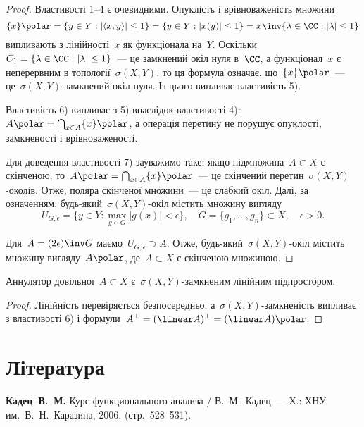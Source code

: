 \begin{proof}
    Властивості 1--4 є очевидними. Опуклість і
    врівноваженість множини
    \begin{equation*}
        \{x\}\polar = \{y \in Y: |\langle x, y \rangle| \le 1\} = \{y \in Y: |x(y)| \le 1 \} = x\inv \{\lambda \in \CC: |\lambda| \le 1\}
    \end{equation*}
    випливають з лінійності~$x$ як функціонала на~$Y$. Оскільки~$C_1 = \{ \lambda \in \CC: |\lambda| \le 1\}$~--- це замкнений окіл нуля в~$\CC$, а функціонал~$x$ є неперервним в топології~$\sigma(X, Y)$, то ця формула означає, що~$\{x\}\polar$~--- це~$\sigma(X, Y)$-замкнений окіл нуля. Із цього випливає властивість 5).
    
    Властивість 6) випливає з 5) внаслідок властивості 4): $A\polar = \bigcap_{x \in A} \{x\}\polar$, а операція перетину не порушує опуклості, замкненості і
    врівноваженості.
    
    Для доведення властивості 7) зауважимо таке: якщо підмножина~$A \subset X$ є скінченою, то~$A\polar = \bigcap_{x \in A} \{x\}\polar$~--- це скінчений перетин~$\sigma(X, Y)$-околів. Отже, поляра скінченої множини~--- це слабкий окіл. Далі, за означенням, будь-який~$\sigma(X, Y)$-окіл містить множину вигляду
    \begin{equation*}
        U_{G, \epsilon} = \{ y \in Y: \max_{g \in G} |g(x)| < \epsilon\}, \quad G = \{g_1, \dots, g_n\} \subset X, \quad \epsilon > 0.
    \end{equation*}

    Для~$A = (2 \epsilon)\inv G$ маємо~$U_{G, \epsilon} \supset A$. Отже, будь-який~$\sigma(X, Y)$-окіл містить множину вигляду~$A\polar$, де~$A \subset X$ є скінченою множиною.
\end{proof}

\begin{corollary}
    Аннулятор довільної~$A \subset X$ є~$\sigma(X, Y)$-замкненим лінійним підпростором.
\end{corollary}

\begin{proof}
    Лінійність перевіряється безпосередньо, а~$\sigma(X, Y)$-замкненість випливає з властивості 6) і формули~$A^\perp = (\linear A)^\perp = (\linear A)\polar$.
\end{proof}

\section{Література}

\begin{enumerate}[label={[\arabic*]}]
\item \textbf{Кадец~В.~М.}
Курс функционального анализа /
В.~М.~Кадец~---
Х.: ХНУ им.~В.~Н.~Каразина, 2006. (стр.~528--531).
\end{enumerate}
